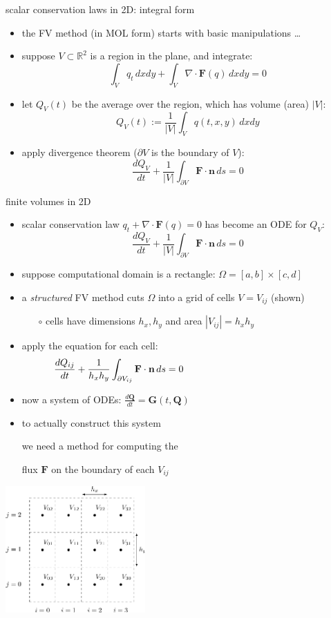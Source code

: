\documentclass[10pt,hyperref,dvipsnames]{beamer}
\newcommand{\bn}{\mathbf{n}}
\newcommand{\bF}{\mathbf{F}}
\newcommand{\bG}{\mathbf{G}}
\newcommand{\bQ}{\mathbf{Q}}
\newcommand{\Div}{\nabla\cdot}
\newcommand{\RR}{\mathbb{R}}
\newcommand{\ds}{\displaystyle}
\begin{document}
\begin{frame}{scalar conservation laws in 2D: integral form}

\begin{itemize}
\item the FV method (in MOL form) starts with basic manipulations \dots
\item suppose $V \subset \RR^2$ is a region in the plane, and integrate:
    $$\int_V q_t\,dx dy + \int_V \Div \bF(q)\,dx dy = 0$$
\item let $Q_V(t)$ be the average over the region, which has volume (area) $|V|$:
    $$Q_V(t) := \frac{1}{|V|} \int_V q(t,x,y)\,dx dy$$
\item apply divergence theorem ($\partial V$ is the boundary of $V$):
    $$\frac{dQ_V}{dt} + \frac{1}{|V|} \int_{\partial V} \bF\cdot \bn\,ds = 0$$
\end{itemize}
\end{frame}


\begin{frame}{finite volumes in 2D}

\begin{itemize}
\item scalar conservation law $q_t + \Div \bF(q) = 0$ has become an ODE for $Q_V$:
    $$\frac{dQ_V}{dt} + \frac{1}{|V|} \int_{\partial V} \bF\cdot \bn\,ds = 0$$
\item suppose computational domain is a rectangle: $\Omega = [a,b] \times [c,d]$
\item a \emph{structured} FV method cuts $\Omega$ into a grid of cells $V=V_{ij}$ (shown)
    \begin{itemize}
    \item[$\circ$] cells have dimensions $h_x,h_y$ and area $|V_{ij}| = h_x h_y$
    \end{itemize}
\item apply the equation for each cell:
    $$\frac{dQ_{ij}}{dt} + \frac{1}{h_x h_y} \int_{\partial V_{ij}} \bF\cdot \bn\,ds = 0 \hspace{50mm}$$
\item now a system of ODEs: $\ds \frac{d\bQ}{dt} = \bG(t,\bQ)$
\item to actually construct this system

we need a method for computing the

flux $\bF$ on the boundary of each $V_{ij}$
\end{itemize}

\vspace{-45mm}
\hfill \includegraphics[width=0.4\textwidth]{figs/bueler11p1}
\end{frame}
\end{document}
